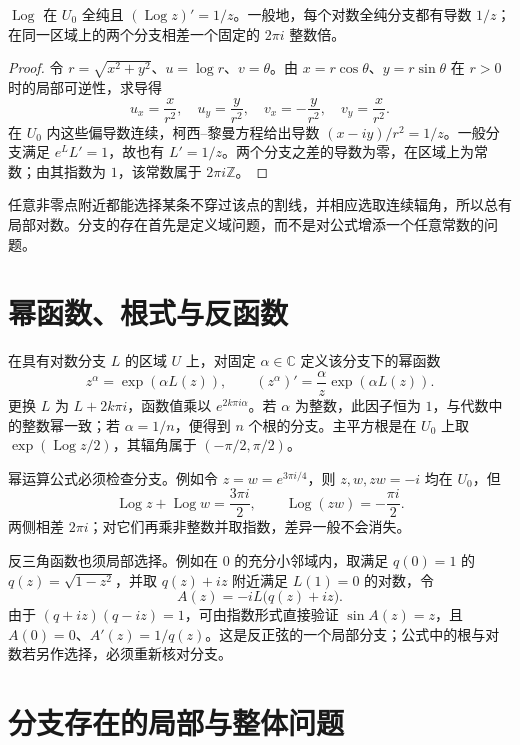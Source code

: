 \documentclass[UTF8,12pt,a4paper,fontset=fandol]{ctexbook}
\begin{document}
\begin{proposition}
\label{prop:ca-log-derivative}
$\operatorname{Log}$ 在 $U_0$ 全纯且 $(\operatorname{Log}z)'=1/z$。一般地，每个对数全纯分支都有导数 $1/z$；在同一区域上的两个分支相差一个固定的 $2\pi i$ 整数倍。
\end{proposition}
\begin{proof}
令 $r=\sqrt{x^2+y^2}$、$u=\log r$、$v=\theta$。由 $x=r\cos\theta$、$y=r\sin\theta$ 在 $r>0$ 时的局部可逆性，求导得
\[
 u_x=\frac{x}{r^2},\quad u_y=\frac{y}{r^2},\quad
 v_x=-\frac{y}{r^2},\quad v_y=\frac{x}{r^2}.
\]
在 $U_0$ 内这些偏导数连续，柯西--黎曼方程给出导数 $(x-iy)/r^2=1/z$。一般分支满足 $e^LL'=1$，故也有 $L'=1/z$。两个分支之差的导数为零，在区域上为常数；由其指数为 $1$，该常数属于 $2\pi i\mathbb{Z}$。
\end{proof}

任意非零点附近都能选择某条不穿过该点的割线，并相应选取连续辐角，所以总有局部对数。分支的存在首先是定义域问题，而不是对公式增添一个任意常数的问题。

\section{幂函数、根式与反函数}

在具有对数分支 $L$ 的区域 $U$ 上，对固定 $\alpha\in\mathbb{C}$ 定义该分支下的幂函数
\begin{equation}
 z^\alpha=\exp(\alpha L(z)),\qquad
 (z^\alpha)'=\frac{\alpha}{z}\exp(\alpha L(z)).
 \label{eq:ca-power-branch}
\end{equation}
更换 $L$ 为 $L+2k\pi i$，函数值乘以 $e^{2k\pi i\alpha}$。若 $\alpha$ 为整数，此因子恒为 $1$，与代数中的整数幂一致；若 $\alpha=1/n$，便得到 $n$ 个根的分支。主平方根是在 $U_0$ 上取 $\exp(\operatorname{Log}z/2)$，其辐角属于 $(-\pi/2,\pi/2)$。

幂运算公式必须检查分支。例如令 $z=w=e^{3\pi i/4}$，则 $z,w,zw=-i$ 均在 $U_0$，但
\[
 \operatorname{Log}z+\operatorname{Log}w=\frac{3\pi i}{2},\qquad
 \operatorname{Log}(zw)=-\frac{\pi i}{2}.
\]
两侧相差 $2\pi i$；对它们再乘非整数并取指数，差异一般不会消失。

反三角函数也须局部选择。例如在 $0$ 的充分小邻域内，取满足 $q(0)=1$ 的 $q(z)=\sqrt{1-z^2}$，并取 $q(z)+iz$ 附近满足 $L(1)=0$ 的对数，令
\[
 A(z)=-iL\bigl(q(z)+iz\bigr).
\]
由于 $(q+iz)(q-iz)=1$，可由指数形式直接验证 $\sin A(z)=z$，且 $A(0)=0$、$A'(z)=1/q(z)$。这是反正弦的一个局部分支；公式中的根与对数若另作选择，必须重新核对分支。

\section{分支存在的局部与整体问题}
\end{document}
